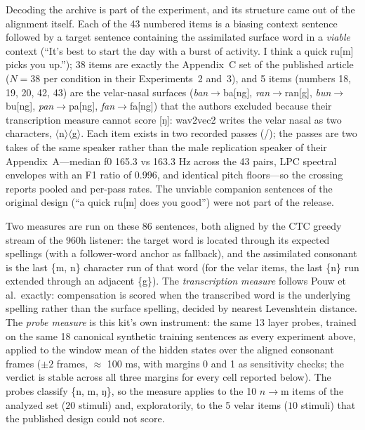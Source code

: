 \documentclass[11pt,a4paper]{article}
\begin{document}
Decoding the archive is part of the experiment, and its structure
came out of the alignment itself. Each of the 43 numbered items is a
biasing context sentence followed by a target sentence containing
the assimilated surface word in a \emph{viable} context (``It's best
to start the day with a burst of activity. I think a quick ru[m]
picks you up.''); 38 items are exactly the Appendix~C set of the
published article ($N=38$ per condition in their Experiments~2 and~3),
and 5 items (numbers 18, 19, 20, 42, 43) are the velar-nasal
surfaces (\emph{ban}$\rightarrow$ba[ng], \emph{ran}$\rightarrow$ran[g],
\emph{bun}$\rightarrow$bu[ng], \emph{pan}$\rightarrow$pa[ng],
\emph{fan}$\rightarrow$fa[ng]) that the authors excluded because
their transcription measure cannot score [ŋ]: wav2vec2 writes the
velar nasal as two characters, $\langle$n$\rangle$$\langle$g$\rangle$.
Each item exists in two recorded passes (/); the
passes are two takes of the same speaker rather than the male
replication speaker of their Appendix~A---median f0 165.3 vs 163.3 Hz
across the 43 pairs, LPC spectral envelopes with an F1 ratio of
0.996, and identical pitch floors---so the crossing reports pooled
and per-pass rates. The unviable companion sentences of the original
design (``a quick ru[m] does you good'') were not part of the
release.

Two measures are run on these 86 sentences, both aligned by the CTC
greedy stream of the 960h listener: the target word is located
through its expected spellings (with a follower-word anchor as
fallback), and the assimilated consonant is the last \{m, n\}
character run of that word (for the velar items, the last \{n\} run
extended through an adjacent \{g\}). The \emph{transcription measure}
follows Pouw et al.\ exactly: compensation is scored when the
transcribed word is the underlying spelling rather than the surface
spelling, decided by nearest Levenshtein distance. The \emph{probe
measure} is this kit's own instrument: the same 13 layer probes,
trained on the same 18 canonical synthetic training sentences as
every experiment above, applied to the window mean of the hidden
states over the aligned consonant frames ($\pm2$ frames, $\approx$
100 ms, with margins 0 and 1 as sensitivity checks; the verdict is
stable across all three margins for every cell reported below). The
probes classify \{n, m, ŋ\}, so the measure applies to the 10
$n\!\rightarrow\!$m items of the analyzed set ($20$ stimuli) and,
exploratorily, to the 5 velar items ($10$ stimuli) that the
published design could not score.
\end{document}
